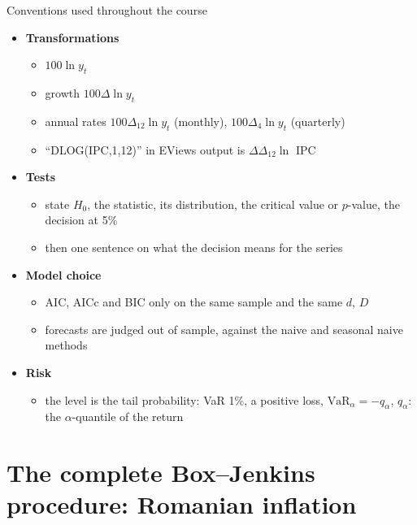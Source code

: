 \begin{frame}{Conventions used throughout the course}
\itemsize{\small}
\begin{itemize}
    \item \textbf{Transformations}
    \begin{itemize}
        \item $100\ln y_t$
        \item growth $100\Delta\ln y_t$
        \item annual rates $100\Delta_{12}\ln y_t$ (monthly), $100\Delta_4\ln y_t$ (quarterly)
        \item ``DLOG(IPC,1,12)'' in EViews output is $\Delta\Delta_{12}\ln$ IPC
    \end{itemize}
    \item \textbf{Tests}
    \begin{itemize}
        \item state $H_0$, the statistic, its distribution, the critical value or $p$-value, the decision at 5\%
        \item then one sentence on what the decision means for the series
    \end{itemize}
    \item \textbf{Model choice}
    \begin{itemize}
        \item AIC, AICc and BIC only on the same sample and the same $d$, $D$
        \item forecasts are judged out of sample, against the naive and seasonal naive methods
    \end{itemize}
    \item \textbf{Risk}
    \begin{itemize}
        \item the level is the tail probability: VaR 1\%, a positive loss, $\mathrm{VaR}_\alpha = -q_\alpha$, $q_\alpha$: the $\alpha$-quantile of the return
    \end{itemize}
\end{itemize}
\end{frame}


\section{The complete Box--Jenkins procedure: Romanian inflation}

